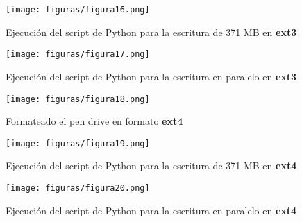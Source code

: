 \begin{figure}[H] %
	\centering
	\texttt{[image: figuras/figura16.png]}  %
	
	
	\caption{Ejecución del script de Python para la escritura de 371 MB en \textbf{ext3}}
	\label{figura16}
\end{figure}

\begin{figure}[H] %
	\centering
	\texttt{[image: figuras/figura17.png]}  %
	
	
	\caption{Ejecución del script de Python para la escritura en paralelo en \textbf{ext3}}
	\label{figura17}
\end{figure}

\begin{figure}[H] %
	\centering
	\texttt{[image: figuras/figura18.png]}  %
	
	
	\caption{Formateado el pen drive en formato \textbf{ext4}}
	\label{figura18}
\end{figure}

\begin{figure}[H] %
	\centering
	\texttt{[image: figuras/figura19.png]}  %
	
	
	\caption{Ejecución del script de Python para la escritura de 371 MB en \textbf{ext4}}
	\label{figura19}
\end{figure}

\begin{figure}[H] %
	\centering
	\texttt{[image: figuras/figura20.png]}  %
	
	
	\caption{Ejecución del script de Python para la escritura en paralelo en \textbf{ext4}}
	\label{figura20}
\end{figure}

